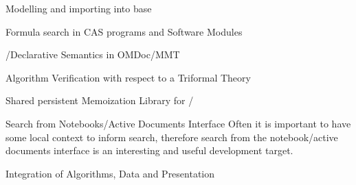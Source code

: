 \begin{workpackage}[id=dksbases,%
  title=Data/Knowledge/Software-Bases,lead=JU,
  ZHRM=12,JURM=46,UWRM=25,SARM=10,LLRM=2,PSRM=4]
\begin{wpdelivs}
\begin{wpdeliv}[due=30,id=findstat,dissem=PU,nature=OTHER,lead=JU]
      {Modelling and importing \FindStat into \DKS base}
  \end{wpdeliv}
   \begin{wpdeliv}[id=cassearch,due=30,nature=OTHER,dissem=PU,lead=JU]
      {Formula search in CAS programs and Software Modules}
    \end{wpdeliv}
  \begin{wpdeliv}[due=36,id=pssem,dissem=PU,nature=OTHER,lead=JU]
      {\Python/\Sage Declarative Semantics in OMDoc/MMT}
  \end{wpdeliv}
  \begin{wpdeliv}[due=36,id=lfmverif,dissem=PU,nature=OTHER,lead=JU]
      {\LMFDB Algorithm Verification with respect to a Triformal Theory}
  \end{wpdeliv}
  \begin{wpdeliv}[due=42,id=persistent-memoization,dissem=PU,nature=OTHER,lead=SA]
    {Shared persistent Memoization Library for \Python/\Sage} 
  \end{wpdeliv}
\begin{wpdeliv}[id=nbad-search,due=42,nature=OTHER,dissem=PU,lead=JU]
  {Search from Notebooks/Active Documents Interface} Often it is important to have some
  local context to inform search, therefore search from the notebook/active documents
  interface is an interesting and useful development target.
\end{wpdeliv}
  \begin{wpdeliv}[due=48,id=lfmint,dissem=PU,nature=R,lead=JU]
      {\LMFDB Integration of Algorithms, Data and Presentation}
  \end{wpdeliv}
\end{wpdelivs}

\begin{comment}
Another connection: on several occasions, we found that software was the best way to
represent certain databases of mathematical knowledge. E.g. in Algebraic Combinatorics we
have a whole zoo of Hopf algebras. Many of them are implemented in MuPAD/Sage by
specifying the objects that index the basis together with computation rules for the
product and coproduct. When we want to retrieve information about such algebras, it's
usually much more convenient to look at the code than to search through the
literature. Especially since the code is usually more correct than the literature because
it's *tested*.

We may also think of providing an interface to \LMFDB via SCSCP
protocol (http://www.symbolic-computing.org/scscp) so it may
be accessed by a variety of other systems (see their current
list at http://www.symbolic-computing.org/scscp). But it's probably as
good to access it via \Sage.

\end{comment}
\end{workpackage}

